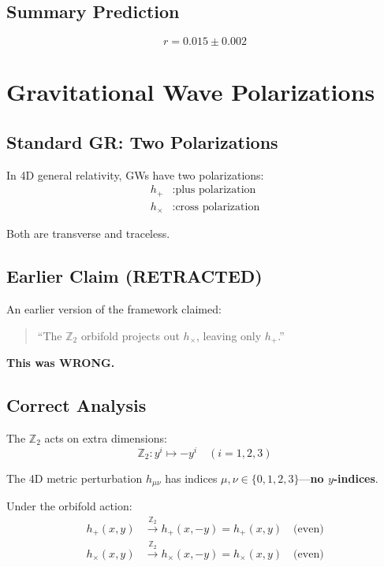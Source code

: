 \documentclass[12pt,a4paper]{article}
\begin{document}
\subsection{Summary Prediction}

\begin{equation}
\boxed{r = 0.015 \pm 0.002}
\end{equation}

\section{Gravitational Wave Polarizations}

\subsection{Standard GR: Two Polarizations}

In 4D general relativity, GWs have two polarizations:
\begin{align}
h_+ &: \text{plus polarization} \\
h_\times &: \text{cross polarization}
\end{align}

Both are transverse and traceless.

\subsection{Earlier Claim (RETRACTED)}

An earlier version of the framework claimed:
\begin{quote}
``The $\mathbb{Z}_2$ orbifold projects out $h_\times$, leaving only $h_+$.''
\end{quote}

\textbf{This was WRONG.}

\subsection{Correct Analysis}

The $\mathbb{Z}_2$ acts on extra dimensions:
\begin{equation}
\mathbb{Z}_2: y^i \mapsto -y^i \quad (i = 1, 2, 3)
\end{equation}

The 4D metric perturbation $h_{\mu\nu}$ has indices $\mu, \nu \in \{0, 1, 2, 3\}$---\textbf{no $y$-indices}.

Under the orbifold action:
\begin{align}
h_+(x, y) &\xrightarrow{\mathbb{Z}_2} h_+(x, -y) = h_+(x, y) \quad \text{(even)} \\
h_\times(x, y) &\xrightarrow{\mathbb{Z}_2} h_\times(x, -y) = h_\times(x, y) \quad \text{(even)}
\end{align}
\end{document}
